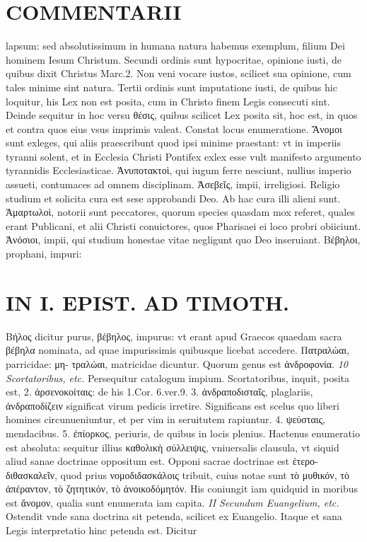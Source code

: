 \documentclass{article}
\begin{document}
\begin{pages}
\section*{COMMENTARII }
\marginpar{[ p.28 ]}\pstart lapsum: sed absolutissimum in humana natura habemus exemplum, filium Dei hominem Iesum Christum. Secundi ordinis sunt hypocritae, opinione iusti, de quibus dixit Christus Marc.2. Non veni vocare iustos, scilicet sua opinione, cum tales minime sint natura. Tertii ordinis sunt imputatione iusti, de quibus hic loquitur, his Lex non est posita, cum in Christo finem Legis consecuti sint.  \pend\pstart Deinde sequitur in hoc versu θέσις, quibus scilicet Lex posita sit, hoc est, in quos et contra quos eius vsus imprimis valeat. Constat locus enumeratione. Ἄνομοι sunt exleges, qui aliis praescribunt quod ipsi minime praestant: vt in imperiis tyranni solent, et in Ecclesia Christi Pontifex exlex esse vult manifesto argumento tyrannidis Ecclesiasticae.  \pend\pstart Ἀνυποτακτοὶ, qui iugum ferre nesciunt, nullius imperio assueti, contumaces ad omnem disciplinam.  \pend\pstart Ἀσεβεῖς, impii, irreligiosi. Religio studium et solicita cura est sese approbandi Deo. Ab hac cura illi alieni sunt.  \pend\pstart Ἁμαρτωλοὶ, notorii sunt peccatores, quorum species quasdam mox referet, quales erant Publicani, et alii Christi conuictores, quos Pharisaei ei loco probri obiiciunt. Ἀνόσιοι, impii, qui studium honestae vitae negligunt quo Deo inseruiant. Βέβηλοι, prophani, impuri:  \pend
\section*{IN I. EPIST. AD TIMOTH. }
\marginpar{[ p.29 ]}\pstart Βήλος dicitur purus, βέβηλος, impurus: vt erant apud Graecos quaedam sacra βέβηλα nominata, ad quae impurissimis quibusque licebat accedere. Πατραλώαι, parricidae: μη- τραλώαι, matricidae dicuntur. Quorum genus est ἀνδροφονία.  \pend
\textit{10 Scortatoribus, etc. }\pstart Persequitur catalogum impium. Scortatoribus, inquit, posita est, 2. ἀρσενοκοίταις: de his 1.Cor. 6.ver.9. 3. ἀνδραποδισταῖς, plaglariis, ἀνδραποδίζειν significat virum pedicis irretire. Significans est scelus quo liberi homines circunueniuntur, et per vim in seruitutem rapiuntur. 4. ψεύσταις, mendacibus. 5. ἐπίορκος, periuris, de quibus in locis plenius. Hactenus enumeratio est absoluta: sequitur illius καθολικὴ σύλλειψις, vniuersalis clausula, vt siquid aliud sanae doctrinae oppositum est. Opponi sacrae doctrinae est ἑτερο- διθασκαλεῖν, quod prius νομοδιδασκάλοις tribuit, cuius notae sunt τὸ μυθικόν, τὸ ἀπέραντον, τὸ  ζητητικόν, τὸ ἀνοικοδόμητόν. His coniungit iam quidquid in moribus est ἄνομον, qualia sunt enumerata iam capita.  \pend
\textit{II Secundum Euangelium, etc. }\pstart Ostendit vnde sana doctrina sit petenda, scilicet ex Euangelio. Itaque et sana Legis interpretatio hinc petenda est. Dicitur  \pend

\end{pages}
\end{document}
